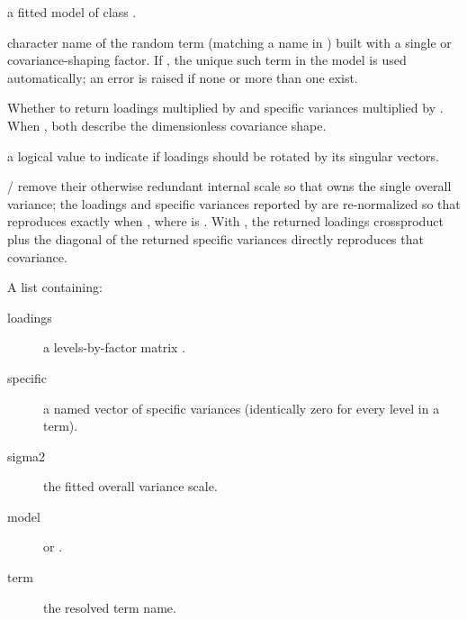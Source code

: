 \documentclass[a4paper]{book}
\begin{document}
%
\begin{Arguments}
\begin{ldescription}

\item[\code{object}] a fitted model of class .
\item[\code{term}] character name of the random term (matching a name in
) built with a single  or 
covariance-shaping factor. If , the unique such term in the model
is used automatically; an error is raised if none or more than one exist.
\item[\code{varianceScale}] Whether to return loadings multiplied by
 and specific variances multiplied by .
When , both describe the dimensionless covariance shape.
\item[\code{rotation}] a logical value to indicate if loadings should be rotated by its
singular vectors.

\end{ldescription}
\end{Arguments}
%
\begin{Details}\relax
{}/ remove their otherwise redundant internal scale so
that  owns the single overall variance; the loadings and specific
variances reported by  are re-normalized so that
reproduces  exactly when
, where  is
. With , the
returned loadings crossproduct plus the diagonal of the returned specific
variances directly reproduces that covariance.
\end{Details}
%
\begin{Value}
A list containing:
\begin{description}

\item[loadings] a levels-by-factor matrix \eqn{\Lambda}{}.
\item[specific] a named vector of specific variances \eqn{\Psi}{} (identically
zero for every level in a  term).
\item[sigma2] the fitted overall variance scale.
\item[model]  or .
\item[term] the resolved term name.

\end{description}

\end{Value}
\end{document}
